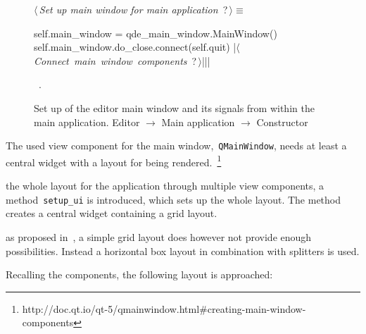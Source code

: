 \documentclass[%
    a4paper,    %
    justified,  %
    nobib,      %
    openany     %
]{tufte-book}
\begin{document}
\begin{figure}
\begin{flushleft} \small
\begin{minipage}{\linewidth}\label{scrap19}\raggedright\small
{} $\langle\,${\itshape Set up main window for main application}\nobreak\ {\footnotesize {?}}$\,\rangle\equiv$
\vspace{-1ex}
\begin{pythoncode}
self.main_window = qde_main_window.MainWindow()
self.main_window.do_close.connect(self.quit)
|\hbox{$\langle\,${\itshape Connect main window components}\nobreak\ {\footnotesize ?}$\,\rangle$}||\NWsep|
\end{pythoncode}
\vspace{1.5ex}
\footnotesize
\begin{list}{}{\setlength{\itemsep}{-\parsep}\setlength{\itemindent}{-\leftmargin}}
\item \NWtxtMacroRefIn\ .

\item{}
\end{list}
\end{minipage}\vspace{4ex}
\end{flushleft}
\caption{Set up of the editor main window and its signals from within the main
  application. \newline{}\newline{}Editor $\rightarrow$ Main application
  $\rightarrow$ Constructor}
\label{editor:lst:main-application:constructor:main-window}
\end{figure}

The used view component for the main window,~\verb+QMainWindow+, needs at least
a central widget with a layout for being
rendered.~\footnote{http://doc.qt.io/qt-5/qmainwindow.html\#creating-main-window-components}

 the whole layout for the
application through multiple view components, a method~\verb+setup_ui+ is
introduced, which sets up the whole layout. The method creates a central widget
containing a grid layout.

 as proposed in~, a simple grid layout does however not provide enough
possibilities. Instead a horizontal box layout in combination with splitters is
used.

Recalling the components, the following layout is approached:
\end{document}
